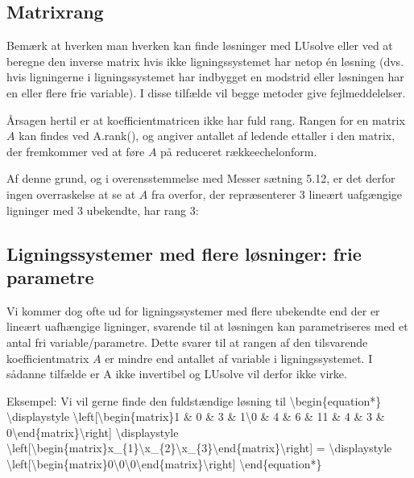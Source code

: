 \documentclass[letterpaper,10pt,english]{jupyterBook}
\begin{document}
\noindent{}


\subsection{Matrixrang}
\label{\detokenize{notebooks/sympy/Notebook_LinAlg1_5:matrixrang}}
Bemærk at hverken man hverken kan finde løsninger med LUsolve eller ved at beregne den inverse matrix hvis  ikke ligningssystemet har netop én løsning (dvs. hvis ligningerne i ligningssystemet har indbygget en modstrid eller løsningen har en eller flere frie variable). I disse tilfælde vil begge metoder give fejlmeddelelser.

Årsagen hertil er at koefficientmatricen ikke har fuld rang. Rangen for en matrix \(A\) kan findes ved A.rank(), og angiver antallet af ledende et\sphinxhyphen{}taller i den matrix, der fremkommer ved at føre \(A\) på reduceret række\sphinxhyphen{}echelonform.

Af denne grund, og i overensstemmelse med Messer sætning 5.12, er det derfor ingen overraskelse at se at \(A\) fra overfor, der repræsenterer 3 lineært uafgængige ligninger med 3 ubekendte, har rang 3:

\begin{sphinxVerbatim}[commandchars=\\\{\}]
\end{sphinxVerbatim}

\noindent{}


\subsection{Ligningssystemer med flere løsninger: frie parametre}
\label{\detokenize{notebooks/sympy/Notebook_LinAlg1_5:ligningssystemer-med-flere-losninger-frie-parametre}}
Vi kommer dog ofte ud for ligningssystemer med flere ubekendte end der er lineært uafhængige ligninger, svarende til at løsningen kan parametriseres med et antal fri variable/parametre. Dette svarer til at rangen af den tilsvarende koefficientmatrix \(A\) er mindre end antallet af variable i ligningssystemet.
I sådanne tilfælde er A ikke invertibel og LU\sphinxhyphen{}solve vil derfor ikke virke.

Eksempel: Vi vil gerne finde den fuldstændige løsning til
\textbackslash{}begin\{equation*\}
\textbackslash{}displaystyle \textbackslash{}left{[}\textbackslash{}begin\{matrix\}1 \& 0 \& 3 \& 1\textbackslash{}0 \& 4 \& 6 \& 1\sphinxhyphen{}1 \& 4 \& 3 \& 0\textbackslash{}end\{matrix\}\textbackslash{}right{]} \textbackslash{}displaystyle \textbackslash{}left{[}\textbackslash{}begin\{matrix\}x\_\{1\}\textbackslash{}x\_\{2\}\textbackslash{}x\_\{3\}\textbackslash{}end\{matrix\}\textbackslash{}right{]} = \textbackslash{}displaystyle \textbackslash{}left{[}\textbackslash{}begin\{matrix\}0\textbackslash{}0\textbackslash{}0\textbackslash{}end\{matrix\}\textbackslash{}right{]}
\textbackslash{}end\{equation*\}
\end{document}

